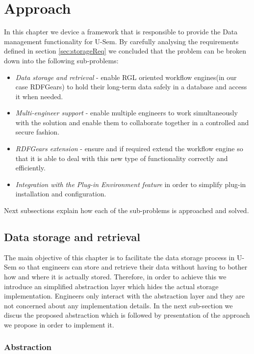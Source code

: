 \section{Approach}
\label{sec:approachStorage}

In this chapter we device a framework that is responsible to provide the Data management functionality for U-Sem. By carefully analysing the requirements defined in section \ref{sec:storageReq} we concluded that the problem can be broken down into the following sub-problems:
\begin{itemize}
	\item \textit{Data storage and retrieval} - enable RGL oriented workflow engines(in our case RDFGears) to hold their long-term data safely in a database and access it when needed.
	\item \textit{Multi-engineer support} - enable multiple engineers to work simultaneously with the solution and enable them to collaborate together in a controlled and secure fashion.
	\item \textit{RDFGears extension} - ensure and if required extend the workflow engine so that it is able to deal with this new type of functionality correctly and efficiently.
	\item \textit{Integration with the Plug-in Environment feature} in order to simplify plug-in installation and configuration.
\end{itemize}

Next subsections explain how each of the sub-problems is approached and solved.

\subsection{Data storage and retrieval}

The main objective of this chapter is to facilitate the data storage process in U-Sem so that engineers can store and retrieve their data without having to bother how and where it is actually stored. Therefore, in order to achieve this we introduce an simplified abstraction layer which hides the actual storage implementation. Engineers only interact with the abstraction layer and they are not concerned about any implementation details. In the next sub-section we discus the proposed abstraction which is followed by presentation of the approach we propose in order to implement it.

\subsubsection{Abstraction}

